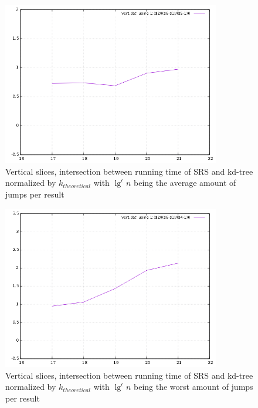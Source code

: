 \begin{figure}[h]
    \centering
    \includegraphics[width = 0.85\textwidth]{pictures/analysis/vert_theory.png}
    \caption{Vertical slices, intersection between running time of SRS and kd-tree normalized by $k_{theoretical}$ with $\lg^\epsilon n$ being the average amount of jumps per result}\label{fig:vert_theory}
\end{figure}


\begin{figure}[h]
    \centering
    \includegraphics[width = 0.85\textwidth]{pictures/analysis/vert_theory_worst_jump.png}
    \caption{Vertical slices, intersection between running time of SRS and kd-tree normalized by $k_{theoretical}$ with $\lg^\epsilon n$ being the worst amount of jumps per result}\label{fig:vert_theory_worst_jump}
\end{figure}


